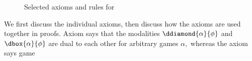 \documentclass[12pt]{cmuthesis}
\theoremstyle{definition}
\theoremstyle{remark}
\begin{document}
\begin{figure}
  \centering
  \begin{calculuscollections}{\columnwidth}
    \begin{calculus}
\cinferenceRule[dglbox|{$[\cdot]$}]{}
{
\linferenceRule[equiv]{\neg\ddiamond{\alpha}{\neg\phi}}{\dbox{\alpha}{\phi}}
}{}
\cinferenceRule[dglassign|{$\langle:=\rangle$}]{}
{
}{}
{
}{}
{
}{}
{
\linferenceRule[equiv]{(\phi \land \psi)}{\ddiamond{\ptest{\psi}}{\phi}}
}{}
{
\linferenceRule[equiv]{\ddiamond{\alpha}{\phi} \lor \ddiamond{\beta}{\phi}}{\ddiamond{\alpha \cup \beta}{\phi}}
}{}
{
\linferenceRule[equiv]{\ddiamond{\alpha}{\ddiamond{\beta}{\phi}}}{\ddiamond{\alpha;\beta}{\phi}}
}{}
{
\linferenceRule[impl]{\phi\lor\ddiamond{\alpha}{\ddiamond{\prepeat{\alpha}}{\phi}}}{\ddiamond{\prepeat{\alpha}}{\phi}}
}{}
{
\linferenceRule[equiv]{\neg\ddiamond{\alpha}{\neg\phi}}{\ddiamond{\pdual{\alpha}}{\phi}}
}{}
\cinferenceRule[dglMon|M]{}
{
\linferenceRule[formula]{\phi\limply\psi}{\ddiamond{\alpha}{\phi}\limply\ddiamond{\alpha}{\psi}}
}{}
\cinferenceRule[dglfixpoint|FP]{}
{
\linferenceRule[formula]{\phi\lor\ddiamond{\alpha}{\psi} \limply \psi}{\ddiamond{\prepeat{\alpha}}{\phi} \to \psi}
}{}
    \end{calculus}
  \end{calculuscollections}
  \caption{Selected axioms and rules for \dGL}
  \label{fig:dgl-axioms}
\end{figure}
We first discuss the individual axioms, then discuss how the axioms are used together in proofs.
Axiom  says that the modalities $\ddiamond{\alpha}{\phi}$ and $\dbox{\alpha}{\phi}$ are dual to each other for arbitrary games $\alpha,$ whereas the axiom  says game 
\end{document}

